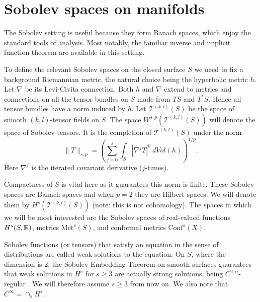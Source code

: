 \section{Sobolev spaces on manifolds}
\label{sobolev}



The Sobolev setting is useful because they form Banach spaces, which enjoy the standard tools of analysis. Most notably, the familiar inverse and implicit function theorem are available in this setting.  

To define the relevant Sobolev spaces on the closed surface $S$ we need to fix a background Riemannian metric, the natural choice being the hyperbolic metric $h$. 
Let $\nabla$ be its Levi-Civita connection. 
Both $h$ and $\nabla$ extend to metrics and connections on all the tensor bundles on $S$ made from $TS$ and $T^*S$. 
Hence all tensor bundles have a norm induced by $h$. 
Let $\mathscr{T}^{(k,l)}(S)$ be the space of smooth $(k,l)$-tensor fields on $S$. 
The space $W^{s,p}(\mathscr{T}^{(k,l)}(S))$ will denote the space of Sobolev tensors. 
It is the completion of $\mathscr{T}^{(k,l)}(S)$ under the norm
\[
\|T\|_{s,p} = \left( \sum_{j = 0}^s \int_S | \nabla^j T|^p \ dVol(h) \right)^{1/p}.
\]
Here $\nabla^j$ is the iterated covariant derivative ($j$-times). 

Compactness of $S$ is vital here as it guarantees this norm is finite. 
These Sobolev spaces are Banach spaces and when $p = 2$ they are Hilbert spaces. 
We will denote them by $H^s(\mathscr{T}^{(k,l)}(S))$ (note: this is not cohomology). 
The spaces in which we will be most interested are the Sobolev spaces of real-valued functions $H^s(S,\mathbb{R})$, metrics $\mathrm{Met}^s(S)$, and conformal metrics $\mathrm{Conf}^s(X)$.

Sobolev functions (or tensors) that satisfy an equation in the sense of distributions are called weak solutions to the equation. 
On $S$, where the dimension is 2, the Sobolev Embedding Theorem on smooth surfaces guarantees that weak solutions in $H^s$ for $s \geq 3$ are actually strong solutions, being $C^{2,\alpha}$-regular \cite{aubin1982}. 
We will therefore assume $s \geq 3$ from now on. 
We also note that $C^\infty = \cap_s H^s$.


